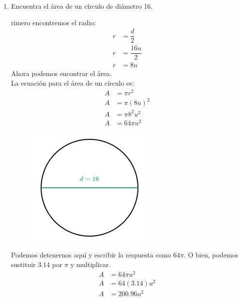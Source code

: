 \documentclass[11pt]{book}
\begin{document}
\begin{enumerate}
  \item Encuentra el área de un círculo de diámetro 16.

        \begin{minipage}{0.65\textwidth}
          rimero encontremos el radio:
          \begin{align*}
            r & = \dfrac d2      \\
            r & = \dfrac{16u}{2} \\
            r & = 8u
          \end{align*}
          Ahora podemos encontrar el área.\\
          La ecuación para el área de un círculo es:
          \begin{align*}
            A & = \pi r^2     \\
            A & = \pi (8u)^2  \\
            A & = \pi 8^2 u^2 \\
            A & = 64 \pi u^2
          \end{align*}
        \end{minipage}\hfill
        \begin{minipage}{0.3\textwidth}
          \begin{figure}[H]
            \centering
            \includegraphics[width=\linewidth]{./Unidad 2/Images/figS10_002.png}
          \end{figure}
        \end{minipage}
        Podemos detenernos aquí y escribir la respuesta como $64\pi$. O bien, podemos sustituir 3.14 por $\pi$ y multiplicar.
        \begin{align*}
          A & = 64 \pi u^2    \\
          A & = 64 (3.14) u^2 \\
          A & = 200.96 u^2
        \end{align*}


\end{enumerate}
\end{document}
